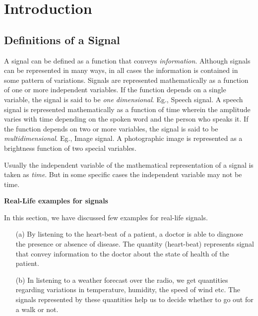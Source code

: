 
\chapter{Introduction}\label{chap1}


\section{Definitions of a Signal}\label{sec1.1}

A signal can be defined as a function that conveys {\em information}. Although signals can be represented in many ways, in all cases the information is contained in some pattern of variations. Signals are represented mathematically as a function of one or more independent variables. If the function depends on a single variable, the signal is said to be {\em one dimensional}. Eg., Speech signal. A speech signal is represented mathematically as a function of time wherein the amplitude varies with time depending on the spoken word and the person who speaks it. If the function depends on two or more variables, the signal is said to be {\em multidimensional}. Eg., Image signal. A photographic image is represented as a brightness function of two special variables.

Usually the independent variable of the mathematical representation of a signal is taken as {\em time}. But in some specific cases the independent variable may not be time.

\noindent
{\bf Real-Life examples for signals}
\smallskip

In this section, we have discussed few examples for real-life signals.
\begin{itemize}
\item[(a)] By listening to the heart-beat of a patient, a doctor is able to diagnose the presence or absence of disease. The quantity (heart-beat) represents signal that convey information to the doctor about the state of health of the patient.

\item[(b)] In listening to a weather forecast over the radio, we get quantities regarding variations in temperature, humidity, the speed of wind etc. The signals represented by these quantities help us to decide whether to go out for a walk or not.
\end{itemize}

